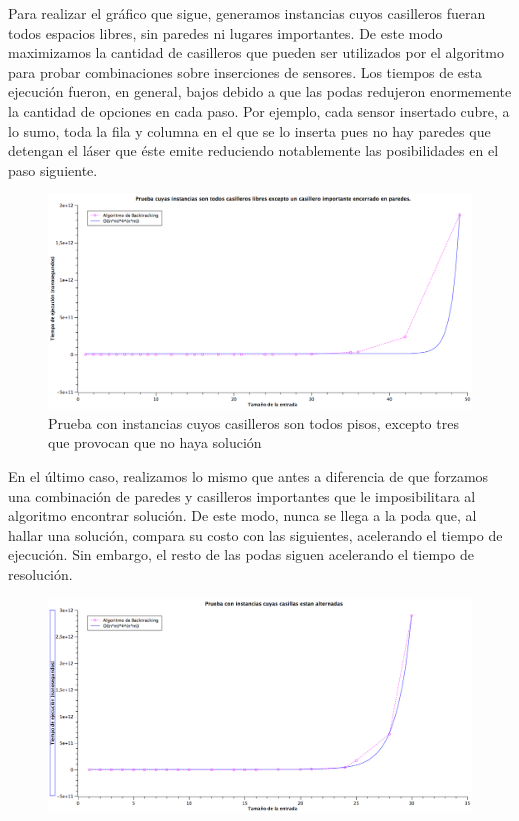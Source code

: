 Para realizar el gráfico que sigue, generamos instancias cuyos casilleros fueran todos espacios libres, sin paredes ni lugares importantes. De este modo maximizamos la cantidad de casilleros que pueden ser utilizados por el algoritmo para probar combinaciones sobre inserciones de sensores. Los tiempos de esta ejecución fueron, en general, bajos debido a que las podas redujeron enormemente la cantidad de opciones en cada paso. Por ejemplo, cada sensor insertado cubre, a lo sumo, toda la fila y columna en el que se lo inserta pues no hay paredes que detengan el láser que éste emite reduciendo notablemente las posibilidades en el paso siguiente.

\begin{figure}[H] %
\begin{center}
\includegraphics[width=460pt]{../imgs/graficoej3_todosUnoSinSolucion.png}
\end{center}
\caption{Prueba con instancias cuyos casilleros son todos pisos, excepto tres que provocan que no haya solución}
\end{figure}

En el último caso, realizamos lo mismo que antes a diferencia de que forzamos una combinación de paredes y casilleros importantes que le imposibilitara al algoritmo encontrar solución. De este modo, nunca se llega a la poda que, al hallar una solución, compara su costo con las siguientes, acelerando el tiempo de ejecución. Sin embargo, el resto de las podas siguen acelerando el tiempo de resolución.

\begin{figure}[H] %
\begin{center}
\includegraphics[width=460pt]{../imgs/graficoej3_alternado.png}
\end{center}
\end{figure}

